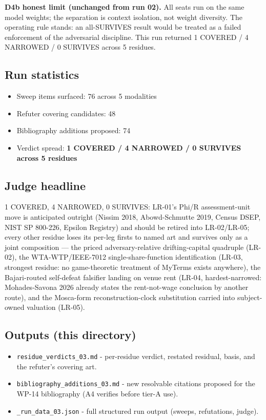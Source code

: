 \documentclass[
  11pt,
]{article}
\providecommand{\tightlist}{%
  \setlength{\itemsep}{0pt}\setlength{\parskip}{0pt}}
\begin{document}
\textbf{D4b honest limit (unchanged from run 02).} All seats run on the
same model weights; the separation is context isolation, not weight
diversity. The operating rule stands: an all-SURVIVES result would be
treated as a failed enforcement of the adversarial discipline. This run
returned 1 COVERED / 4 NARROWED / 0 SURVIVES across 5 residues.

\subsection{Run statistics}\label{run-statistics}

\begin{itemize}
\tightlist
\item
  Sweep items surfaced: 76 across 5 modalities
\item
  Refuter covering candidates: 48
\item
  Bibliography additions proposed: 74
\item
  Verdict spread: \textbf{1 COVERED / 4 NARROWED / 0 SURVIVES across 5
  residues}
\end{itemize}

\subsection{Judge headline}\label{judge-headline}

1 COVERED, 4 NARROWED, 0 SURVIVES: LR-01's Phi/R assessment-unit move is
anticipated outright (Nissim 2018, Abowd-Schmutte 2019, Census DSEP,
NIST SP 800-226, Epsilon Registry) and should be retired into
LR-02/LR-05; every other residue loses its per-leg firsts to named art
and survives only as a joint composition --- the priced
adversary-relative drifting-capital quadruple (LR-02), the
WTA-WTP/IEEE-7012 single-share-function identification (LR-03, strongest
residue: no game-theoretic treatment of MyTerms exists anywhere), the
Bajari-routed self-defeat falsifier landing on venue rent (LR-04,
hardest-narrowed: Mohades-Savona 2026 already states the rent-not-wage
conclusion by another route), and the Mosca-form reconstruction-clock
substitution carried into subject-owned valuation (LR-05).

\subsection{Outputs (this directory)}\label{outputs-this-directory}

\begin{itemize}
\tightlist
\item
  \texttt{residue\_verdicts\_03.md} - per-residue verdict, restated
  residual, basis, and the refuter's covering art.
\item
  \texttt{bibliography\_additions\_03.md} - new resolvable citations
  proposed for the WP-14 bibliography (A4 verifies before tier-A use).
\item
  \texttt{\_run\_data\_03.json} - full structured run output (sweeps,
  refutations, judge).
\end{itemize}
\end{document}

